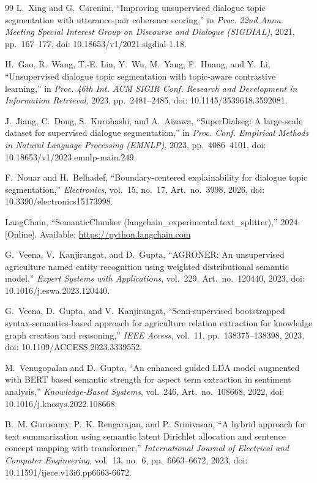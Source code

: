 \documentclass[journal]{IEEEtran}
\begin{document}
\begin{thebibliography}{99}
L.~Xing and G.~Carenini, ``Improving unsupervised dialogue topic segmentation with utterance-pair coherence scoring,'' in \emph{Proc. 22nd Annu. Meeting Special Interest Group on Discourse and Dialogue (SIGDIAL)}, 2021, pp.~167--177, doi: 10.18653/v1/2021.sigdial-1.18.

H.~Gao, R.~Wang, T.-E. Lin, Y.~Wu, M.~Yang, F.~Huang, and Y.~Li, ``Unsupervised dialogue topic segmentation with topic-aware contrastive learning,'' in \emph{Proc. 46th Int. ACM SIGIR Conf. Research and Development in Information Retrieval}, 2023, pp.~2481--2485, doi: 10.1145/3539618.3592081.

J.~Jiang, C.~Dong, S.~Kurohashi, and A.~Aizawa, ``SuperDialseg: A large-scale dataset for supervised dialogue segmentation,'' in \emph{Proc. Conf. Empirical Methods in Natural Language Processing (EMNLP)}, 2023, pp.~4086--4101, doi: 10.18653/v1/2023.emnlp-main.249.

F.~Nouar and H.~Belhadef, ``Boundary-centered explainability for dialogue topic segmentation,'' \emph{Electronics}, vol.~15, no.~17, Art.~no.~3998, 2026, doi: 10.3390/electronics15173998.

LangChain, ``SemanticChunker (langchain\_experimental.text\_splitter),'' 2024. [Online]. Available: \url{https://python.langchain.com}

G.~Veena, V.~Kanjirangat, and D.~Gupta, ``AGRONER: An unsupervised agriculture named entity recognition using weighted distributional semantic model,'' \emph{Expert Systems with Applications}, vol.~229, Art.~no.~120440, 2023, doi: 10.1016/j.eswa.2023.120440.

G.~Veena, D.~Gupta, and V.~Kanjirangat, ``Semi-supervised bootstrapped syntax-semantics-based approach for agriculture relation extraction for knowledge graph creation and reasoning,'' \emph{IEEE Access}, vol.~11, pp.~138375--138398, 2023, doi: 10.1109/ACCESS.2023.3339552.

M.~Venugopalan and D.~Gupta, ``An enhanced guided LDA model augmented with BERT based semantic strength for aspect term extraction in sentiment analysis,'' \emph{Knowledge-Based Systems}, vol.~246, Art.~no.~108668, 2022, doi: 10.1016/j.knosys.2022.108668.

B.~M. Gurusamy, P.~K. Rengarajan, and P.~Srinivasan, ``A hybrid approach for text summarization using semantic latent Dirichlet allocation and sentence concept mapping with transformer,'' \emph{International Journal of Electrical and Computer Engineering}, vol.~13, no.~6, pp.~6663--6672, 2023, doi: 10.11591/ijece.v13i6.pp6663-6672.


\end{thebibliography}
\end{document}
